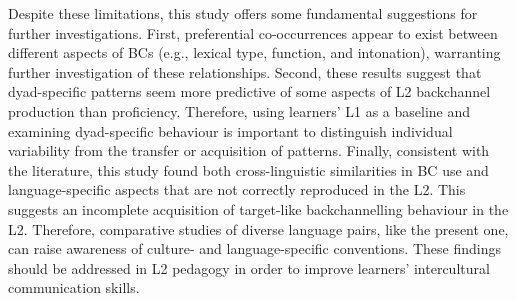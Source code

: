 Despite these limitations, this study offers some fundamental suggestions for further investigations. First, preferential co-occurrences appear to exist between different aspects of BCs (e.g., lexical type, function, and intonation), warranting further investigation of these relationships. Second, these results suggest that dyad-specific patterns seem more predictive of some aspects of L2 backchannel production than proficiency. Therefore, using learners’ L1 as a baseline and examining dyad-specific behaviour is important to distinguish individual variability from the transfer or acquisition of patterns. Finally, consistent with the literature, this study found both cross-linguistic similarities in BC use and language-specific aspects that are not correctly reproduced in the L2. This suggests an incomplete acquisition of target-like backchannelling behaviour in the L2. Therefore, comparative studies of diverse language pairs, like the present one, can raise awareness of culture- and language-specific conventions. These findings should be addressed in L2 pedagogy in order to improve learners’ intercultural communication skills.
